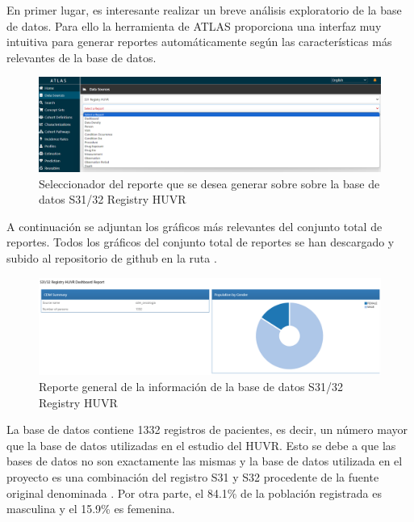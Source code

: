 En primer lugar, es interesante realizar un breve análisis exploratorio de la base de datos. Para ello la herramienta  de ATLAS proporciona una interfaz muy intuitiva para generar reportes automáticamente según las características más relevantes de la base de datos.

\begin{figure}[H]
    \centering
    \includegraphics[width=1\textwidth]{figures/atlasDataSources.png}
    \caption{Seleccionador del reporte que se desea generar sobre sobre la base de datos S31/32 Registry HUVR}
    \label{figure:atlasDataSources}
\end{figure}


A continuación se adjuntan los gráficos más relevantes del conjunto total de reportes. Todos los gráficos del conjunto total de reportes se han descargado y subido al repositorio de github en la ruta .

\begin{figure}[H]
    \centering
    \includegraphics[width=1\textwidth]{figures/dashboardREPORT.png}
    \caption{Reporte general de la información de la base de datos S31/32 Registry HUVR}
    \label{figure:dashboardREPORT}
\end{figure}

La base de datos contiene 1332 registros de pacientes, es decir, un número mayor que la base de datos utilizadas en el estudio del HUVR. Esto se debe a que las bases de datos no son exactamente las mismas y la base de datos utilizada en el proyecto es una combinación del registro S31 y S32 procedente de la fuente original denominada . Por otra parte, el 84.1\% de la población registrada es masculina y el 15.9\% es femenina.

